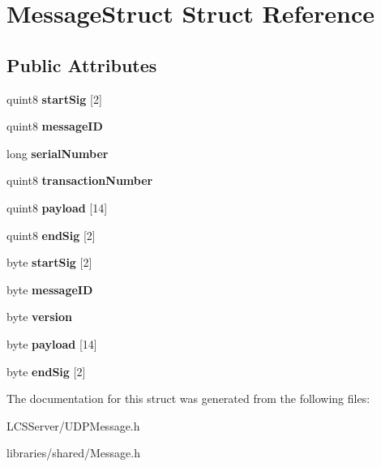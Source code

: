 \hypertarget{struct_message_struct}{}\section{Message\+Struct Struct Reference}
\label{struct_message_struct}
\subsection*{Public Attributes}
\begin{DoxyCompactItemize}
\item 
\mbox{\label{struct_message_struct_a0535f64f3989eae01990c53c23fe08e8}} 
quint8 {\bfseries start\+Sig} \mbox{[}2\mbox{]}
\item 
\mbox{\label{struct_message_struct_abe941ca31c36d0b1569a7cafbcf91196}} 
quint8 {\bfseries message\+ID}
\item 
\mbox{\label{struct_message_struct_adf41e56d25615082438ec128c2c7d661}} 
long {\bfseries serial\+Number}
\item 
\mbox{\label{struct_message_struct_a2a44fcd272b937c2be697fcc0450aed6}} 
quint8 {\bfseries transaction\+Number}
\item 
\mbox{\label{struct_message_struct_a219eeba08bb8055dc6d32a8d0a44c632}} 
quint8 {\bfseries payload} \mbox{[}14\mbox{]}
\item 
\mbox{\label{struct_message_struct_a2c3cd25c9ea8936d241de4b7225780a1}} 
quint8 {\bfseries end\+Sig} \mbox{[}2\mbox{]}
\item 
\mbox{\label{struct_message_struct_ad3ac51e91dc523cc41de10da3398f84e}} 
byte {\bfseries start\+Sig} \mbox{[}2\mbox{]}
\item 
\mbox{\label{struct_message_struct_aef81d2e199950b2e1caf466dc7f7e566}} 
byte {\bfseries message\+ID}
\item 
\mbox{\label{struct_message_struct_a17a551a6d7e5ef7b125417faa7df5c0e}} 
byte {\bfseries version}
\item 
\mbox{\label{struct_message_struct_a31bd16a9f2d245d1959ca2f88d35e94f}} 
byte {\bfseries payload} \mbox{[}14\mbox{]}
\item 
\mbox{\label{struct_message_struct_ab25b1c8090759db18cfcb2e94fcccaab}} 
byte {\bfseries end\+Sig} \mbox{[}2\mbox{]}
\end{DoxyCompactItemize}


The documentation for this struct was generated from the following files\+:\begin{DoxyCompactItemize}
\item 
L\+C\+S\+Server/U\+D\+P\+Message.\+h\item 
libraries/shared/Message.\+h\end{DoxyCompactItemize}
